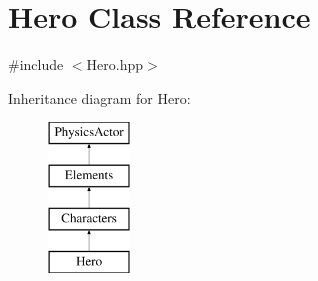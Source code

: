 \hypertarget{class_hero}{\section{Hero Class Reference}
\label{class_hero}
}


{\ttfamily \#include $<$Hero.\+hpp$>$}

Inheritance diagram for Hero\+:\begin{figure}[H]
\begin{center}
\leavevmode
\includegraphics[height=4.000000cm]{class_hero}
\end{center}
\end{figure}
